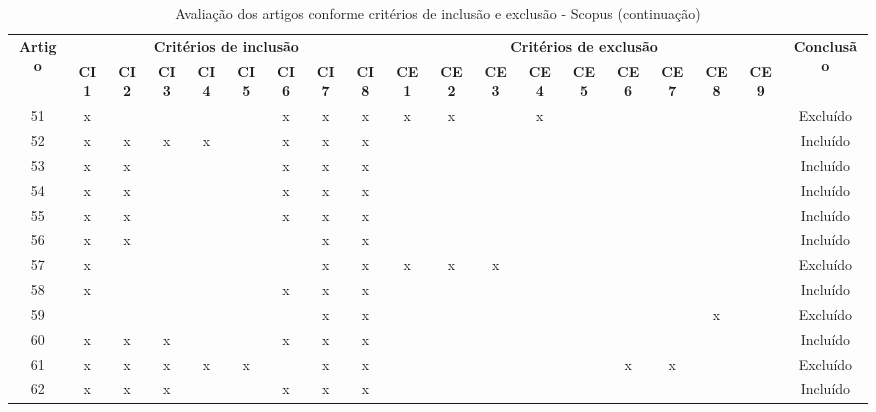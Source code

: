 \documentclass[
	12pt,				%
	oneside,			%
	a4paper,			%
	english,			%
	brazil				%
	]{abntex2ppgsi}
\begin{document}
\begin{apendicesenv}
\begin{table}[H]
\centering
\caption{Avaliação dos artigos conforme critérios de inclusão e exclusão - Scopus (continuação)}
\label{tab:critincluexclu_cont} 
\setlength{\tabcolsep}{1.5pt} %
\footnotesize %
\begin{tabular}{c | c c c c c c c c | c c c c c c c c c | c}
\toprule
    \multirow{2}{*}{\textbf{Artigo}} & 
    \multicolumn{8}{c|}{\textbf{Critérios de inclusão}} &
    \multicolumn{9}{c|}{\textbf{Critérios de exclusão}} &
    \multirow{2}{*}{\textbf{Conclusão}} \\ 
    \cline{2-18}
 & \tiny\textbf{CI1} & \tiny\textbf{CI2} & \tiny\textbf{CI3} & \tiny\textbf{CI4} & \tiny\textbf{CI5} & \tiny\textbf{CI6} & \tiny\textbf{CI7} & \tiny\textbf{CI8} & \tiny\textbf{CE1} & \tiny\textbf{CE2} & \tiny\textbf{CE3} & \tiny\textbf{CE4} & \tiny\textbf{CE5} & \tiny\textbf{CE6} & \tiny\textbf{CE7} & \tiny\textbf{CE8} & \tiny\textbf{CE9} & \\
\midrule
51 & x &   &   &   &   & x & x & x & x & x &   & x &   &   &   &   &   & Excluído \\
52 & x & x & x & x &   & x & x & x &   &   &   &   &   &   &   &   &   & Incluído \\
53 & x & x &   &   &   & x & x & x &   &   &   &   &   &   &   &   &   & Incluído \\
54 & x & x &   &   &   & x & x & x &   &   &   &   &   &   &   &   &   & Incluído \\
55 & x & x &   &   &   & x & x & x &   &   &   &   &   &   &   &   &   & Incluído \\
56 & x & x &   &   &   &   & x & x &   &   &   &   &   &   &   &   &   & Incluído \\
57 & x &   &   &   &   &   & x & x & x & x & x &   &   &   &   &   &   & Excluído \\
58 & x &   &   &   &   & x & x & x &   &   &   &   &   &   &   &   &   & Incluído \\
59 &   &   &   &   &   &   & x & x &   &   &   &   &   &   &   & x &   & Excluído \\
60 & x & x & x &   &   & x & x & x &   &   &   &   &   &   &   &   &   & Incluído \\
61 & x & x & x & x & x &   & x & x &   &   &   &   &   & x & x &   &   & Excluído \\
62 & x & x & x &   &   & x & x & x &   &   &   &   &   &   &   &   &   & Incluído \\

\end{tabular}
\end{table}
\end{apendicesenv}
\end{document}
